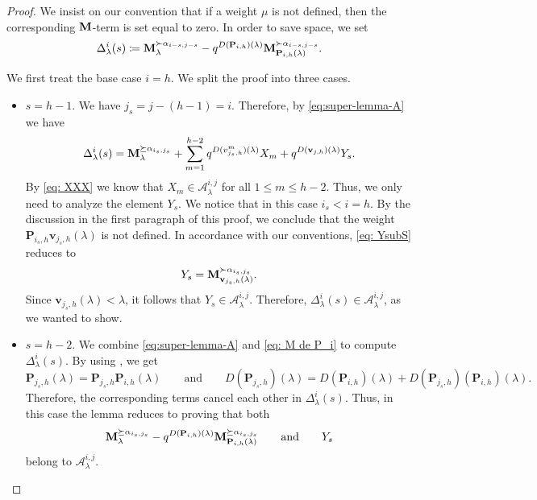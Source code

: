 \begin{proof}
We insist on our convention that if a weight $\mu$ is not defined, then the corresponding $\mathbf{M}$-term is set equal to zero.
In order to save space, we set
\begin{equation}
    \Delta_\lambda^{i}(s) \coloneqq   \mathbf{M}_{\lambda}^{\succ \alpha_{i-s,j-s}} - q^{D(\mathbf{P}_{i,h} )(\lambda)}  \mathbf{M}_{\mathbf{P}_{i,h}(\lambda)}^{\succ \alpha_{i-s,j-s}}. 
\end{equation}


We first treat the base case $i=h$. 
We split the proof into three cases.

\begin{itemize}
    \item $s=h-1$.  We have $j_s=j-(h-1)=i$. Therefore, by \eqref{eq:super-lemma-A} we have
    \begin{equation}
\Delta_{\lambda}^i(s)  =   \mathbf{M}_{\lambda}^{\succeq \alpha_{i_s,j_s}}  + \sum_{m=1}^{h-2}  q^{D(v_{j_s,h}^m)(\lambda)}  X_m + q^{D(\mathbf{v}_{j,h})(\lambda)}Y_s.  
    \end{equation}
By \eqref{eq: XXX} we know that $X_m\in \mathcal{A}_{\lambda}^{i,j}$ for all $1\leq m \leq h-2$.  
Thus, we only need to analyze the element $Y_s$. 
We notice that in this case $i_s<i=h$.
By the discussion in the first paragraph of this proof, we conclude that the weight $\mathbf{P}_{i_s,h}\mathbf{v}_{j_s,h}(\lambda )$ is not defined. 
In accordance with our conventions, \eqref{eq: YsubS} reduces to 
\begin{equation}\label{eq: YYY solo}
       Y_s=  \mathbf{M}_{\mathbf{v}_{j_s,h}(\lambda )}^{\succ \alpha_{i_s,j_s}}.
\end{equation}
Since $\mathbf{v}_{j_s,h}(\lambda)<\lambda$, it follows that $Y_s\in \mathcal{A}_{\lambda}^{i,j}$. 
Therefore, $\Delta_{\lambda}^i(s) \in  \mathcal{A}_{\lambda}^{i,j}$, as we wanted to show. 

\item $s=h-2$. We combine \eqref{eq:super-lemma-A}
 and \eqref{eq: M de P_i} to compute $\Delta_{\lambda}^i(s)$.
 By using , we get
 \begin{equation}
     \mathbf{P}_{j_s,h}(\lambda) = \mathbf{P}_{j_s,h}\mathbf{P}_{i,h}(\lambda) \qquad \mbox{and} \qquad D(\mathbf{P}_{j_s,h})(\lambda) = D(\mathbf{P}_{i,h})(\lambda) + D(\mathbf{P}_{j_s,h})(\mathbf{P}_{i,h})(\lambda). 
 \end{equation}
 Therefore, the corresponding terms cancel each other in $\Delta_{\lambda}^i(s)$.
 Thus, in this case the lemma reduces to proving that both 
 \begin{equation}
  \mathbf{M}_{\lambda}^{\succeq \alpha_{i_s,j_s}} - q^{D(\mathbf{P}_{i,h})(\lambda)} \mathbf{M}_{\mathbf{P}_{i,h}(\lambda)}^{\succeq \alpha_{i_s,j_s}}   \qquad \mbox{and} \qquad    Y_s
 \end{equation}
 belong to $\mathcal{A}_{\lambda}^{i,j}$. 


\end{itemize}
\end{proof}

